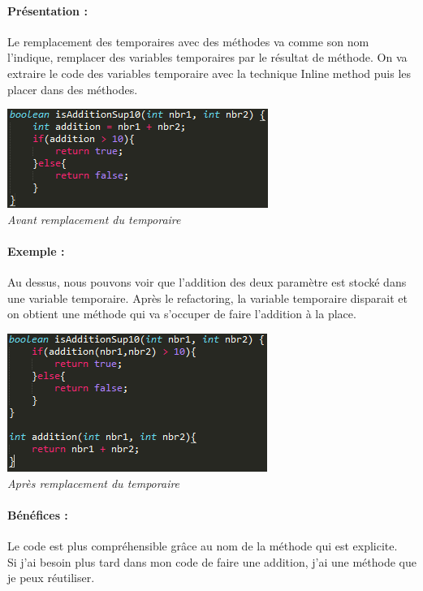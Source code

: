 \documentclass[a4paper,twoside,12pt,openright]{report}
\begin{document}
\paragraph{Présentation :}
Le remplacement des temporaires avec des méthodes va comme son nom l'indique, remplacer des variables temporaires par le résultat de méthode. On va extraire le code des variables temporaire avec la technique Inline method puis les placer dans des méthodes.

\begin{center}
\includegraphics[scale=1]{Image/Remplacement_Temp_Methode.png}\\
\itshape{Avant remplacement du temporaire}
\end{center}

\paragraph{Exemple :}
Au dessus, nous pouvons voir que l'addition des deux paramètre est stocké dans une variable temporaire. Après le refactoring, la variable temporaire disparait et on obtient une méthode qui va s'occuper de faire l'addition à la place.

\begin{center}
\includegraphics[scale=1]{Image/Remplacement_Temp_Methode2.png}\\
\itshape{Après remplacement du temporaire}
\end{center}

\paragraph{Bénéfices :}
Le code est plus compréhensible grâce au nom de la méthode qui est explicite.\\
Si j'ai besoin plus tard dans mon code de faire une addition, j'ai une méthode que je peux réutiliser.\\
\end{document}
